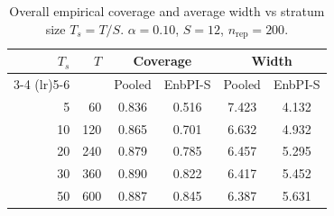 \begin{table}[ht]
\centering
\caption{Overall empirical coverage and average width vs stratum size $T_s = T/S$.
$\alpha=0.10$, $S=12$, $n_{\mathrm{rep}}=200$.}
\label{tab:e2_stratum_size}
\begin{tabular}{r r cc cc}
\toprule
$T_s$ & $T$ & \multicolumn{2}{c}{Coverage} & \multicolumn{2}{c}{Width} \\
\cmidrule(lr){3-4} \cmidrule(lr){5-6}
& & Pooled & EnbPI-S & Pooled & EnbPI-S \\
\midrule
5 & 60 & 0.836 & 0.516 & 7.423 & 4.132 \\
10 & 120 & 0.865 & 0.701 & 6.632 & 4.932 \\
20 & 240 & 0.879 & 0.785 & 6.457 & 5.295 \\
30 & 360 & 0.890 & 0.822 & 6.417 & 5.452 \\
50 & 600 & 0.887 & 0.845 & 6.387 & 5.631 \\
\bottomrule
\end{tabular}
\end{table}